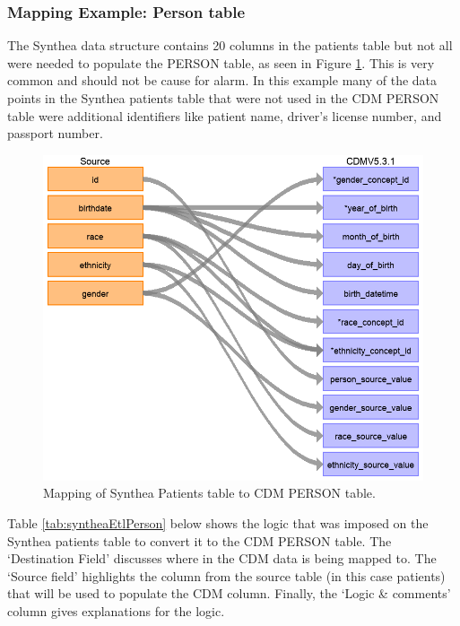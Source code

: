 \documentclass[11pt]{book}
\theoremstyle{definition}
\theoremstyle{definition}
\theoremstyle{definition}
\theoremstyle{remark}
\begin{document}
\hypertarget{mapping-example-person-table}{%
\subsubsection*{Mapping Example: Person table}\label{mapping-example-person-table}}

The Synthea data structure contains 20 columns in the patients table but not all were needed to populate the PERSON table, as seen in Figure \ref{fig:syntheaPerson}. This is very common and should not be cause for alarm. In this example many of the data points in the Synthea patients table that were not used in the CDM PERSON table were additional identifiers like patient name, driver's license number, and passport number.

\begin{figure}
\includegraphics[width=1\linewidth]{images/ExtractTransformLoad/syntheaPersonTable} \caption{Mapping of Synthea Patients table to CDM PERSON table.}\label{fig:syntheaPerson}
\end{figure}

Table \ref{tab:syntheaEtlPerson} below shows the logic that was imposed on the Synthea patients table to convert it to the CDM PERSON table. The `Destination Field' discusses where in the CDM data is being mapped to. The `Source field' highlights the column from the source table (in this case patients) that will be used to populate the CDM column. Finally, the `Logic \& comments' column gives explanations for the logic.
\end{document}
